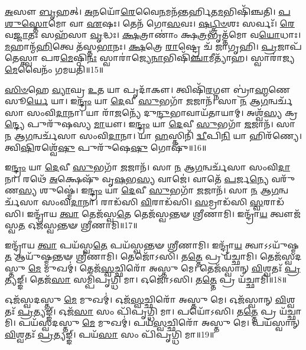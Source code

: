 \-\ul{𑌅}\-𑌸𑍗 \ul{𑌬𑍃}\-𑌹𑌤𑍍।
\-\ul{𑌅}\-𑌨𑌯𑍋᳴\-\ul{𑌰𑍇}\-𑌵𑍈\-\ul{𑌨}\-𑌮𑌨᳴𑌨𑍍𑌤𑌰𑍍\mbox{}𑌹𑌿𑌤\-\ul{𑌮}\-𑌭𑌿𑌷𑌿᳴𑌞𑍍𑌚𑌤𑌿।
\-\ul{𑌪}\-\-\ul{𑌶𑍁}\-\-\ul{𑌸𑍍𑌤𑍋}\-𑌮𑍋 𑌵𑌾 \ul{𑌏}\-𑌷𑌃।
𑌤𑍇𑌨᳴ 𑌗𑍋\-\ul{𑌸}\-𑌵𑌃।
\-\ul{𑌷}\-\-\ul{𑌟𑍍𑌤𑍍𑌰𑌿}\-\-\ul{𑍞}\-𑌶𑌃 𑌸𑌰𑍍𑌵𑌃᳴।
\-\ul{𑌰𑍇}\-𑌵\-\ul{𑌜𑍍𑌜𑌾}\-𑌤𑌃 𑌸𑌹᳴𑌸𑌾 \ul{𑌵𑍃}\-𑌦𑍍𑌧𑌃।
\-\ul{𑌕𑍍𑌷}\-𑌤𑍍𑌰𑌾𑌣𑌾𑌂॑ 𑌕𑍍𑌷\-\ul{𑌤𑍍𑌰}\-𑌭𑍃𑌤𑍍𑌤᳴𑌮𑍋 𑌵\-\ul{𑌯𑍋}\-𑌧𑌾𑌃।
\-\ul{𑌮}\-𑌹𑌾𑌨𑍍𑌮᳴\-\ul{𑌹𑌿}\-𑌤𑍍𑌵𑍇 𑌤᳴𑌸𑍍𑌤\-\ul{𑌭𑌾}\-𑌨𑌃।
\-\ul{𑌕𑍍𑌷}\-𑌤𑍍𑌰𑍇 \ul{𑌰𑌾}\-𑌷𑍍𑌟𑍍𑌰𑍇 𑌚᳴ 𑌜𑌾𑌗𑍃𑌹𑌿।
\-\ul{𑌪𑍍𑌰}\-𑌜𑌾𑌪᳴𑌤𑍇𑌸𑍍𑌤𑍍𑌵𑌾 𑌪𑌰\-\ul{𑌮𑍇}\-𑌷𑍍𑌠𑌿\-\ul{𑌨𑌃} 𑌸𑍍𑌵𑌾𑌰𑌾॑𑌜𑍍𑌯𑍇\-\ul{𑌨𑌾}\-𑌭𑌿𑌷𑌿᳴\-\ul{𑌞𑍍𑌚𑌾}\-𑌮𑍀𑌤𑍍𑌯𑌾᳴𑌹।
𑌸𑍍𑌵𑌾𑌰𑌾॑𑌜𑍍𑌯\-\ul{𑌮𑍇}\-𑌵𑍈𑌨𑌂᳴ 𑌗𑌮𑌯𑌤𑌿॥15॥\anuvakamend[\-\ul{𑌇}\-\-\ul{𑌵} \ul{𑌭}\-\-\ul{𑌵}\-\-\ul{𑌤𑌿} \ul{𑌰}\-\-\ul{𑌥}\-\-\ul{𑌨𑍍𑌤}\-𑌰\-\ul{𑌮𑌾}\-𑌹𑍈𑌕𑌂᳴ 𑌚]

\-\ul{𑌸𑌿}\-\-\ul{𑍞}\-𑌹𑍇 \ul{𑌵𑍍𑌯𑌾}\-𑌘𑍍𑌰 \ul{𑌉}\-𑌤 𑌯𑌾 𑌪𑍃𑌦𑌾᳴𑌕𑍗।
𑌤𑍍𑌵𑌿𑌷𑌿᳴\-\ul{𑌰}\-𑌗𑍍𑌨𑍗 𑌬𑍍𑌰𑌾॑\-\ul{𑌹𑍍𑌮}\-𑌣𑍇 𑌸𑍂\-\ul{𑌰𑍍𑌯𑍇} 𑌯𑌾।
𑌇\-\ul{𑌨𑍍𑌦𑍍𑌰𑌂} 𑌯𑌾 \ul{𑌦𑍇}\-𑌵𑍀 \ul{𑌸𑍁}\-𑌭𑌗𑌾᳴ \ul{𑌜}\-𑌜𑌾𑌨᳴।
𑌸𑌾 \ul{𑌨} 𑌆\-\ul{𑌗}\-𑌨𑍍𑌵𑌰𑍍𑌚᳴𑌸𑌾 𑌸𑌂𑌵𑌿\-\ul{𑌦𑌾}\-𑌨𑌾।
𑌯𑌾 𑌰𑌾᳴\-\ul{𑌜}\-𑌨𑍍𑌯𑍇᳴ 𑌦𑍁\-\ul{𑌨𑍍𑌦𑍁}\-𑌭𑌾𑌵𑌾𑌯᳴𑌤𑌾𑌯𑌾𑌮𑍍।
𑌅𑌶𑍍𑌵᳴\-\ul{𑌸𑍍𑌯} 𑌕𑍍𑌰\-\ul{𑌨𑍍𑌦𑍍𑌯𑍇} 𑌪𑍁𑌰𑍁᳴𑌷𑌸𑍍𑌯 \ul{𑌮𑌾}\-𑌯𑍗।
𑌇\-\ul{𑌨𑍍𑌦𑍍𑌰𑌂} 𑌯𑌾 \ul{𑌦𑍇}\-𑌵𑍀 \ul{𑌸𑍁}\-𑌭𑌗𑌾᳴ \ul{𑌜}\-𑌜𑌾𑌨᳴।
𑌸𑌾 \ul{𑌨} 𑌆\-\ul{𑌗}\-𑌨𑍍𑌵𑌰𑍍𑌚᳴𑌸𑌾 𑌸𑌂𑌵𑌿\-\ul{𑌦𑌾}\-𑌨𑌾।
𑌯𑌾 \ul{𑌹}\-𑌸𑍍𑌤𑌿𑌨𑌿᳴ \ul{𑌦𑍍𑌵𑍀}\-𑌪𑌿\-\ul{𑌨𑌿} 𑌯𑌾 𑌹𑌿𑌰᳴𑌣𑍍𑌯𑍇।
𑌤𑍍𑌵𑌿\-\ul{𑌷𑌿}\-𑌰𑌶𑍍𑌵𑍇᳴\-\ul{𑌷𑍁} 𑌪𑍁𑌰𑍁᳴𑌷𑍇\-\ul{𑌷𑍁} 𑌗𑍋𑌷𑍁᳴॥16॥

𑌇\-\ul{𑌨𑍍𑌦𑍍𑌰𑌂} 𑌯𑌾 \ul{𑌦𑍇}\-𑌵𑍀 \ul{𑌸𑍁}\-𑌭𑌗𑌾᳴ \ul{𑌜}\-𑌜𑌾𑌨᳴।
𑌸𑌾 \ul{𑌨} 𑌆\-\ul{𑌗}\-𑌨𑍍𑌵𑌰𑍍𑌚᳴𑌸𑌾 𑌸𑌂𑌵𑌿\-\ul{𑌦𑌾}\-𑌨𑌾।
𑌰𑌥𑍇᳴ \ul{𑌅}\-𑌕𑍍𑌷𑍇𑌷𑍁᳴ 𑌵𑍃\-\ul{𑌷}\-𑌭\-\ul{𑌸𑍍𑌯} 𑌵𑌾𑌜𑍇॑।
𑌵𑌾𑌤𑍇᳴ \ul{𑌪}\-𑌰𑍍𑌜\-\ul{𑌨𑍍𑌯𑍇} 𑌵𑌰𑍁᳴𑌣\-\ul{𑌸𑍍𑌯} 𑌶𑍁𑌷𑍍𑌮𑍇॑।
𑌇\-\ul{𑌨𑍍𑌦𑍍𑌰𑌂} 𑌯𑌾 \ul{𑌦𑍇}\-𑌵𑍀 \ul{𑌸𑍁}\-𑌭𑌗𑌾᳴ \ul{𑌜}\-𑌜𑌾𑌨᳴।
𑌸𑌾 \ul{𑌨} 𑌆\-\ul{𑌗}\-𑌨𑍍𑌵𑌰𑍍𑌚᳴𑌸𑌾 𑌸𑌂𑌵𑌿\-\ul{𑌦𑌾}\-𑌨𑌾।
𑌰𑌾𑌡᳴𑌸𑌿 \ul{𑌵𑌿}\-𑌰𑌾𑌡᳴𑌸𑌿।
\-\ul{𑌸}\-𑌮𑍍𑌰𑌾𑌡᳴𑌸𑌿 \ul{𑌸𑍍𑌵}\-𑌰𑌾𑌡᳴𑌸𑌿।
𑌇𑌨𑍍𑌦𑍍𑌰𑌾᳴𑌯 \ul{𑌤𑍍𑌵𑌾} 𑌤𑍇𑌜᳴𑌸𑍍𑌵\-\ul{𑌤𑍇} 𑌤𑍇𑌜᳴𑌸𑍍𑌵𑌨𑍍𑌤𑍟 𑌶𑍍𑌰𑍀𑌣𑌾𑌮𑌿।
𑌇𑌨𑍍𑌦𑍍𑌰𑌾᳴\-\ul{𑌯} 𑌤𑍍𑌵𑍗𑌜᳴𑌸𑍍𑌵\-\ul{𑌤} 𑌓𑌜᳴𑌸𑍍𑌵𑌨𑍍𑌤𑍟 𑌶𑍍𑌰𑍀𑌣𑌾𑌮𑌿॥17॥

𑌇𑌨𑍍𑌦𑍍𑌰𑌾᳴𑌯 \ul{𑌤𑍍𑌵𑌾} 𑌪𑌯᳴𑌸𑍍𑌵\-\ul{𑌤𑍇} 𑌪𑌯᳴𑌸𑍍𑌵𑌨𑍍𑌤𑍟 𑌶𑍍𑌰𑍀𑌣𑌾𑌮𑌿।
𑌇𑌨𑍍𑌦𑍍𑌰𑌾᳴\-\ul{𑌯} 𑌤𑍍𑌵𑌾\-𑌽𑌽𑌯𑍁᳴𑌷𑍍𑌮\-\ul{𑌤} 𑌆𑌯𑍁᳴𑌷𑍍𑌮𑌨𑍍𑌤𑍟 𑌶𑍍𑌰𑍀𑌣𑌾𑌮𑌿।
𑌤𑍇𑌜𑍋᳴𑌽𑌸𑌿।
𑌤\-\ul{𑌤𑍍𑌤𑍇} 𑌪𑍍𑌰 𑌯᳴𑌚𑍍𑌛𑌾𑌮𑌿।
𑌤𑍇𑌜᳴𑌸𑍍𑌵𑌦𑌸𑍍𑌤𑍁 \ul{𑌮𑍇} 𑌮𑍁𑌖𑌮𑍍॑।
𑌤𑍇𑌜᳴\-\ul{𑌸𑍍𑌵}\-𑌚𑍍𑌛𑌿𑌰𑍋᳴ 𑌅𑌸𑍍𑌤𑍁 𑌮𑍇।
𑌤𑍇𑌜᳴𑌸𑍍𑌵𑌾𑌨𑍍 \ul{𑌵𑌿}\-𑌶𑍍𑌵𑌤𑌃᳴ \ul{𑌪𑍍𑌰}\-𑌤𑍍𑌯𑌙𑍍𑌙𑍍।
𑌤𑍇𑌜᳴\-\ul{𑌸𑌾} 𑌸𑌮𑍍𑌪𑌿᳴𑌪𑍃𑌗𑍍𑌧𑌿 𑌮𑌾।
𑌓𑌜𑍋᳴𑌽𑌸𑌿।
𑌤\-\ul{𑌤𑍍𑌤𑍇} 𑌪𑍍𑌰 𑌯᳴𑌚𑍍𑌛𑌾𑌮𑌿॥18॥

𑌓𑌜᳴𑌸𑍍𑌵𑌦𑌸𑍍𑌤𑍁 \ul{𑌮𑍇} 𑌮𑍁𑌖𑌮𑍍॑।
𑌓𑌜᳴\-\ul{𑌸𑍍𑌵}\-𑌚𑍍𑌛𑌿𑌰𑍋᳴ 𑌅𑌸𑍍𑌤𑍁 𑌮𑍇।
𑌓𑌜᳴𑌸𑍍𑌵𑌾𑌨𑍍 \ul{𑌵𑌿}\-𑌶𑍍𑌵𑌤𑌃᳴ \ul{𑌪𑍍𑌰}\-𑌤𑍍𑌯𑌙𑍍𑌙𑍍।
𑌓𑌜᳴\-\ul{𑌸𑌾} 𑌸𑌂 𑌪𑌿᳴𑌪𑍃𑌗𑍍𑌧𑌿 𑌮𑌾।
𑌪𑌯𑍋᳴𑌽𑌸𑌿।
𑌤\-\ul{𑌤𑍍𑌤𑍇} 𑌪𑍍𑌰 𑌯᳴𑌚𑍍𑌛𑌾𑌮𑌿।
𑌪𑌯᳴𑌸𑍍𑌵𑌦𑌸𑍍𑌤𑍁 \ul{𑌮𑍇} 𑌮𑍁𑌖𑌮𑍍॑।
𑌪𑌯᳴\-\ul{𑌸𑍍𑌵}\-𑌚𑍍𑌛𑌿𑌰𑍋᳴ 𑌅𑌸𑍍𑌤𑍁 𑌮𑍇।
𑌪𑌯᳴𑌸𑍍𑌵𑌾𑌨𑍍 \ul{𑌵𑌿}\-𑌶𑍍𑌵𑌤𑌃᳴ \ul{𑌪𑍍𑌰}\-𑌤𑍍𑌯𑌙𑍍𑌙𑍍।
𑌪𑌯᳴\-\ul{𑌸𑌾} 𑌸𑌂 𑌪𑌿᳴𑌪𑍃𑌗𑍍𑌧𑌿 𑌮𑌾॥19॥

